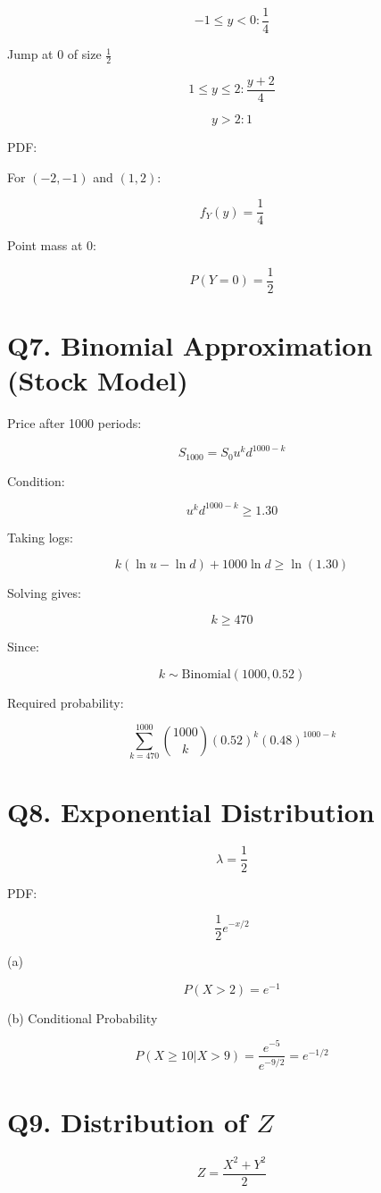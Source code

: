 \documentclass[11pt]{article}
\begin{document}
\[
-1\le y<0: \frac{1}{4}
\]

Jump at 0 of size $\frac{1}{2}$

\[
1\le y\le 2: \frac{y+2}{4}
\]

\[
y>2:1
\]

PDF:

For $(-2,-1)$ and $(1,2)$:

\[
f_Y(y)=\frac{1}{4}
\]

Point mass at 0:

\[
P(Y=0)=\frac{1}{2}
\]

\section*{Q7. Binomial Approximation (Stock Model)}

Price after 1000 periods:

\[
S_{1000}=S_0u^k d^{1000-k}
\]

Condition:

\[
u^k d^{1000-k}\ge1.30
\]

Taking logs:

\[
k(\ln u-\ln d)+1000\ln d\ge\ln(1.30)
\]

Solving gives:

\[
k\ge470
\]

Since:

\[
k\sim\text{Binomial}(1000,0.52)
\]

Required probability:

\[
\sum_{k=470}^{1000}\binom{1000}{k}(0.52)^k(0.48)^{1000-k}
\]

\section*{Q8. Exponential Distribution}

\[
\lambda=\frac{1}{2}
\]

PDF:

\[
\frac{1}{2}e^{-x/2}
\]

(a)

\[
P(X>2)=e^{-1}
\]

(b) Conditional Probability

\[
P(X\ge10|X>9)=\frac{e^{-5}}{e^{-9/2}}=e^{-1/2}
\]

\section*{Q9. Distribution of $Z$}

\[
Z=\frac{X^2+Y^2}{2}
\]
\end{document}
